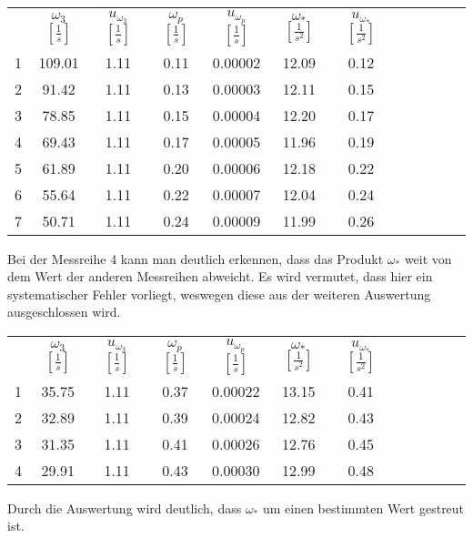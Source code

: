 \begin{center}
    \newpage
    \begin{tabular}{gccccccccccc}
         &      $\omega_3$ $[\frac{1}{s}]$ &  $u_{\omega_3}$ $[\frac{1}{s}]$ &    $\omega_p$ $[\frac{1}{s}]$ &     $u_{\omega_p}$ $[\frac{1}{s}]$ &     $\omega_*$ $[\frac{1}{s^2}]$&  $u_{\omega_*}$ $[\frac{1}{s^2}]$\\
        1 &  109.01 &  1.11 &  0.11 &  0.00002 &  12.09 &  0.12 \\     
        2 &   91.42 &  1.11 &  0.13 &  0.00003 &  12.11 &  0.15 \\     
        3 &   78.85 &  1.11 &  0.15 &  0.00004 &  12.20 &  0.17 \\     
        4 &   69.43 &  1.11 &  0.17 &  0.00005 &  11.96 &  0.19 \\     
        5 &   61.89 &  1.11 &  0.20 &  0.00006 &  12.18 &  0.22 \\     
        6 &   55.64 &  1.11 &  0.22 &  0.00007 &  12.04 &  0.24 \\      
        7 &   50.71 &  1.11 &  0.24 &  0.00009 &  11.99 &  0.26 \\ 
    \end{tabular}
\end{center}
Bei der Messreihe 4 kann man deutlich erkennen, dass das Produkt $\omega_*$ weit von dem Wert der anderen Messreihen abweicht. Es wird vermutet, dass hier ein systematischer Fehler vorliegt, weswegen diese aus der weiteren Auswertung ausgeschlossen wird. 
\begin{center}
    \begin{tabular}{gccccccccccc}
         &      $\omega_3$ $[\frac{1}{s}]$ &  $u_{\omega_3}$ $[\frac{1}{s}]$ &    $\omega_p$ $[\frac{1}{s}]$ &     $u_{\omega_p}$ $[\frac{1}{s}]$ &     $\omega_*$ $[\frac{1}{s^2}]$&  $u_{\omega_*}$ $[\frac{1}{s^2}]$\\
        1 &  35.75 &  1.11 &  0.37 &  0.00022 &  13.15 &  0.41 \\      
        2 &  32.89 &  1.11 &  0.39 &  0.00024 &  12.82 &  0.43 \\      
        3 &  31.35 &  1.11 &  0.41 &  0.00026 &  12.76 &  0.45 \\      
        4 &  29.91 &  1.11 &  0.43 &  0.00030 &  12.99 &  0.48 \\
    \end{tabular}
\end{center}
Durch die Auswertung wird deutlich, dass $\omega_*$ um einen bestimmten Wert gestreut ist. 
